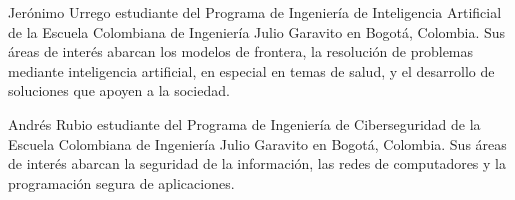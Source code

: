 \documentclass[10pt,journal,compsoc]{IEEEtran}
\begin{document}
\begin{IEEEbiographynophoto}{Jerónimo Urrego}
estudiante del Programa de Ingeniería de Inteligencia Artificial de la Escuela Colombiana de Ingeniería Julio Garavito en Bogotá, Colombia. Sus áreas de interés abarcan los modelos de frontera, la resolución de problemas mediante inteligencia artificial, en especial en temas de salud, y el desarrollo de soluciones que apoyen a la sociedad.
\end{IEEEbiographynophoto}

\begin{IEEEbiographynophoto}{Andrés Rubio}
estudiante del Programa de Ingeniería de Ciberseguridad de la Escuela Colombiana de Ingeniería Julio Garavito en Bogotá, Colombia. Sus áreas de interés abarcan la seguridad de la información, las redes de computadores y la programación segura de aplicaciones.
\end{IEEEbiographynophoto}

\vfill %
\end{document}
